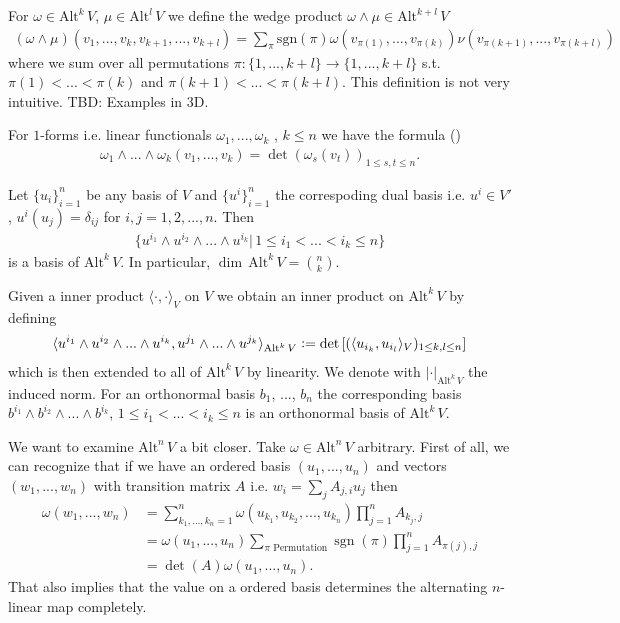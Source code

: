 \documentclass[12pt,a4paper]{article}
\numberwithin{equation}{subsection}
\numberwithin{lemma}{subsection}
\theoremstyle{definition}
\DeclareMathOperator{\sgn}{sgn}
\newcommand{\alternating}[2]{ {\text{Alt}^{#1}\,#2} }
\begin{document}
For $\omega \in 
\alternating{k}{V}$, $\mu \in 
\alternating{l}{V}$ we define the wedge product $\omega \wedge \mu \in 
\alternating{k+l}{V}$ 
\begin{align*}
    (\omega \wedge \mu) (v_1,...,v_k,v_{k+1},...,v_{k+l}) =
    \sum\limits_\pi
    \text{sgn}(\pi) \omega(v_{\pi(1)},...,v_{\pi(k)}) 
    \nu(v_{\pi(k+1)},...,v_{\pi(k+l)})
\end{align*}
where we sum over all permutations 
$\pi: \{1,...,k+l\} \rightarrow \{1,...,k+l\}$ 
s.t. $\pi(1) < ... < \pi(k)$ and $\pi(k+1) < ... < \pi(k+l)$.
This definition is not very intuitive.
{\color{red} TBD: Examples in 3D}.

For $1$-forms i.e. linear functionals $\omega_1,...,\omega_k$ 
, $k \leq n$ we have the formula (\cite[p.260]{topology_and_geometry})
\begin{align}
    \omega_1 \wedge ... \wedge \omega_k (v_1,...,v_k)
    = \det (\omega_s(v_t))_{1\leq s,t \leq n}. 
    \label{eq:wedge_product_of_one_forms}
\end{align}

Let $\{ u_i\}_{i=1}^n$ be any basis of $V$ and $\{ u^i\}_{i=1}^n$ the 
correspoding dual basis i.e. 
$u^i \in V'$, $u^i(u_j) = \delta_{ij}$ for $i,j = 1,2,..., n$. Then 
\begin{align*}
    \{u^{i_1} \wedge u^{i_2} \wedge ... \wedge u^{i_k} | \, 
    1 \leq i_1 < ... < i_k \leq n \}
\end{align*}
is a basis of $\alternating{k}{V}$. In particular, 
$\dim\, \alternating{k}{V} = \binom{n}{k}$.

Given a inner product $\langle\cdot, \cdot \rangle_V$ on $V$ we obtain an inner 
product on $\alternating{k}{V}$ by defining
\begin{align*}
    \langle u^{i_1} \wedge u^{i_2} \wedge... \wedge u^{i_k}, 
    u^{j_1} \wedge... \wedge u^{j_k} \rangle_{\alternating{k}{V}} 
    \vcentcolon= \det \left[ ( \langle u_{i_k}, u_{i_l} \rangle_V )_
    {1\leq k,l \leq n} \right] 
\end{align*}
which is then extended to all of $\alternating{k}{V}$ by linearity. 
We denote with $\lvert \cdot \rvert _\alternating{k}{V}$ the induced norm.
For an orthonormal basis 
$b_1$, ..., $b_n$ the corresponding basis 
$b^{i_1} \wedge b^{i_2} \wedge ... \wedge b^{i_k}$, 
$1\leq i_1 < ... < i_k \leq n$ is an orthonormal basis of $\alternating{k}{V}$.

We want to examine $\alternating{n}{V}$ a bit closer. Take 
$\omega \in \alternating{n}{V}$ arbitrary. First of all, we can 
recognize that if we have an ordered basis $(u_1,...,u_n)$ and vectors
$(w_1,...,w_n)$ with transition matrix $A$ i.e. $w_i = \sum_j A_{j,i} u_j$ 
then
\begin{align*}
    \omega(w_1,...,w_n) &= \sum\limits_{k_1,...,k_n = 1}^n 
        \omega(u_{k_1},u_{k_2},..., u_{k_n}) \prod\limits_{j=1}^n A_{k_j,j}
    \\ &= \omega(u_1,...,u_n) \sum\limits_{\pi \text{ Permutation}}
        \sgn(\pi) \prod\limits_{j=1}^n A_{\pi(j),j}
    \\ &= \det(A) \omega(u_1,...,u_n).
\end{align*}
That also implies that the value on a ordered basis determines 
the alternating $n$-linear map completely.
\end{document}

